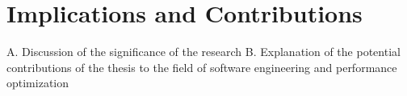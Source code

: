 \chapter{Implications and Contributions}
A. Discussion of the significance of the research
B. Explanation of the potential contributions of the thesis to the field of software engineering and performance optimization
